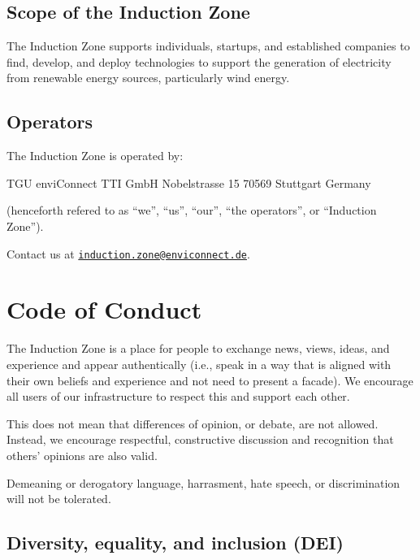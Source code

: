 \documentclass[
  10pt,
  a4paper,
]{article}
\begin{document}
\hypertarget{scope-of-the-induction-zone}{%
\subsection{Scope of the Induction
Zone}\label{scope-of-the-induction-zone}}

The Induction Zone supports individuals, startups, and established
companies to find, develop, and deploy technologies to support the
generation of electricity from renewable energy sources, particularly
wind energy.

\hypertarget{operators}{%
\subsection{Operators}\label{operators}}

The Induction Zone is operated by:

TGU enviConnect TTI GmbH Nobelstrasse 15 70569 Stuttgart Germany

(henceforth refered to as ``we'', ``us'', ``our'', ``the operators'', or
``Induction Zone'').

Contact us at
\href{mailto:induction.zone@enviconnect.de}{\nolinkurl{induction.zone@enviconnect.de}}.

\hypertarget{code-of-conduct}{%
\section{Code of Conduct}\label{code-of-conduct}}

The Induction Zone is a place for people to exchange news, views, ideas,
and experience and appear authentically (i.e., speak in a way that is
aligned with their own beliefs and experience and not need to present a
facade). We encourage all users of our infrastructure to respect this
and support each other.

This does not mean that differences of opinion, or debate, are not
allowed. Instead, we encourage respectful, constructive discussion and
recognition that others' opinions are also valid.

Demeaning or derogatory language, harrasment, hate speech, or
discrimination will not be tolerated.

\hypertarget{diversity-equality-and-inclusion-dei}{%
\subsection{Diversity, equality, and inclusion
(DEI)}\label{diversity-equality-and-inclusion-dei}}
\end{document}
